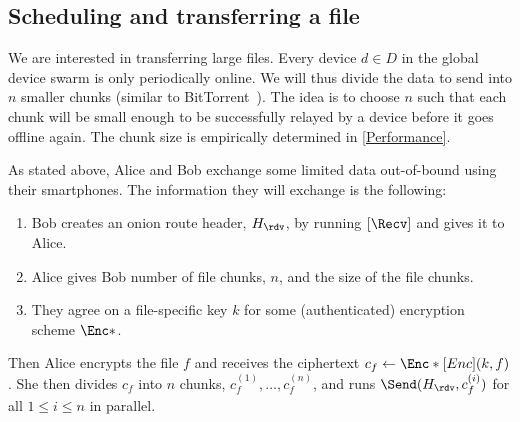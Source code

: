 \subsection{Scheduling and transferring a file}%
\label{sec:file_exchange}

We are interested in transferring large files.
Every device \(d\in D\) in the global device swarm is only periodically online.
We will thus divide the data to send into \(n\) smaller chunks (similar to 
BitTorrent~\cite{BitTorrent}).
The idea is to choose \(n\) such that each chunk will be small enough to be 
successfully relayed by a device before it goes offline again.
The chunk size is empirically determined in \cref{Performance}.

As stated above, Alice and Bob exchange some limited data out-of-bound using 
their smartphones.
The information they will exchange is the following:
\begin{enumerate}
  \item Bob creates an onion route header, \(H_\rdv\), by running 
    \([\Recv]\) %
    and gives it to Alice.
  \item Alice gives Bob number of file chunks, \(n\), and the size of the file 
    chunks.
  \item They agree on a file-specific key \(k\) for some (authenticated) 
    encryption scheme \(\Enc*\).
\end{enumerate}
Then Alice encrypts the file \(f\) and receives the ciphertext \(c_f\gets 
  \Enc*[Enc](k, f)\).
She then divides \(c_f\) into \(n\) chunks, \(c_f^{(1)}, \dotsc, c_f^{(n)}\), 
and runs \(\Send(H_\rdv, c_f^{(i)})\) for all \(1\leq i\leq n\) in 
parallel.
